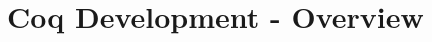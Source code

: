 \documentclass[preprint]{sigplanconf}
\newcommand{\FOR}{{\tt for} \ }
\newcommand{\WHERE}{{\tt where} \ }
\newcommand{\IN}{ \ {\tt in} \ }
\newcommand{\RETURN}{{\tt return} \ }
\newcommand{\relation}[1]{\ensuremath{\mathit{#1}}\xspace}
\begin{document}
%
%
\section{Coq Development - Overview}
\end{document}
